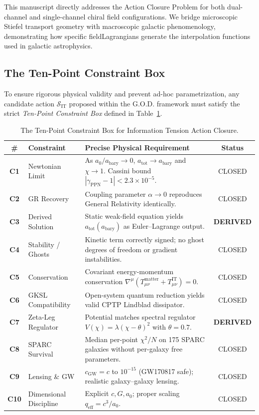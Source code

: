 \documentclass[11pt,a4paper]{article}
\theoremstyle{definition}
\begin{document}
This manuscript directly addresses the Action Closure Problem for both dual-channel and single-channel chiral field configurations. We bridge microscopic Stiefel transport geometry with macroscopic galactic phenomenology, demonstrating how specific fieldLagrangians generate the interpolation functions used in galactic astrophysics.

\subsection{The Ten-Point Constraint Box}
To ensure rigorous physical validity and prevent ad-hoc parametrization, any candidate action $\mathcal{S}_{\text{IT}}$ proposed within the G.O.D. framework must satisfy the strict \emph{Ten-Point Constraint Box} defined in Table~\ref{tab:constraint_box}.

\begin{table}[h!]
\centering
\small
\begin{tabular}{@{}>{\bfseries}c l p{8.2cm} c@{}}
\toprule
\# & Constraint & Precise Physical Requirement & Status \\
\midrule
C1 & Newtonian Limit & As $a_0/a_{\text{bary}} \to 0$, $a_{\text{tot}} \to a_{\text{bary}}$ and $\chi \to 1$. Cassini bound $|\gamma_{\text{PPN}} - 1| < 2.3 \times 10^{-5}$. & \color{cyan}CLOSED \\
C2 & GR Recovery & Coupling parameter $\alpha \to 0$ reproduces General Relativity identically. & \color{cyan}CLOSED \\
C3 & Derived Solution & Static weak-field equation yields $a_{\text{tot}}(a_{\text{bary}})$ as Euler--Lagrange output. & \color{gold}\textbf{DERIVED} \\
C4 & Stability / Ghosts & Kinetic term correctly signed; no ghost degrees of freedom or gradient instabilities. & \color{cyan}CLOSED \\
C5 & Conservation & Covariant energy-momentum conservation $\nabla^\mu (T_{\mu\nu}^{\text{matter}} + T_{\mu\nu}^{\text{IT}}) = 0$. & \color{cyan}CLOSED \\
C6 & GKSL Compatibility & Open-system quantum reduction yields valid CPTP Lindblad dissipator. & \color{cyan}CLOSED \\
C7 & Zeta-Leg Regulator & Potential matches spectral regulator $V(\chi) = \lambda(\chi - \theta)^2$ with $\theta = 0.7$. & \color{gold}\textbf{DERIVED} \\
C8 & SPARC Survival & Median per-point $\chi^2/N$ on 175 SPARC galaxies without per-galaxy free parameters. & \color{cyan}CLOSED \\
C9 & Lensing \& GW & $c_{\text{GW}} = c$ to $10^{-15}$ (GW170817 safe); realistic galaxy--galaxy lensing. & \color{cyan}CLOSED \\
C10 & Dimensional Discipline & Explicit $c, G, a_0$; proper scaling $q_{\text{eff}} = c^3 / a_0$. & \color{cyan}CLOSED \\
\bottomrule
\end{tabular}
\caption{The Ten-Point Constraint Box for Information Tension Action Closure.}
\label{tab:constraint_box}
\end{table}
\end{document}
